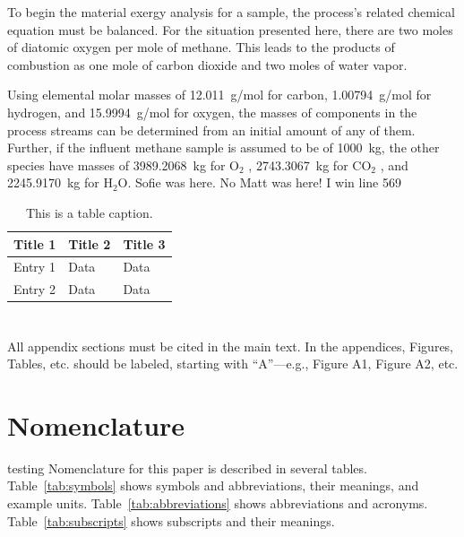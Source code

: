 \documentclass[energies,article,submit,pdftex,moreauthors]{Definitions/mdpi}
\begin{document}
To begin the material exergy analysis for a sample,
the process's related chemical equation must be balanced.
For the situation presented here,
there are two moles of diatomic oxygen per mole of methane.
This leads to the products of combustion as
one mole of carbon dioxide and two moles of water vapor. %

Using elemental molar masses of 12.011~g/mol for carbon,
1.00794~g/mol for hydrogen,
and 15.9994~g/mol for oxygen,
the masses of components in the process streams
can be determined from an initial amount of any of them.
Further, if the influent methane sample is assumed
to be of 1000~kg,
the other species have masses of 3989.2068~kg for O$_2$ ,
2743.3067~kg for CO$_2$ ,
and 2245.9170~kg for H$_2$O.
Sofie was here.
No Matt was here!
I win line 569
\begin{table}
\caption{This is a table caption.\label{tab5}}
\begin{tabularx}{\textwidth}{CCC}
\toprule
\textbf{Title 1}	& \textbf{Title 2}	& \textbf{Title 3}\\
\midrule
Entry 1		& Data			& Data\\
Entry 2		& Data			& Data\\
\bottomrule
\end{tabularx}
\end{table}

\section[\appendixname~\thesection]{}
All appendix sections must be cited in the main text. In the appendices, Figures, Tables, etc. should be labeled, starting with ``A''---e.g., Figure A1, Figure A2, etc.


\section[\appendixname~\thesection]{Nomenclature}
\label{sec:nomenclature}

testing
Nomenclature for this paper is described in several tables.
Table~\ref{tab:symbols} shows symbols and abbreviations, their meanings, and example units.
Table~\ref{tab:abbreviations} shows abbreviations and acronyms.
Table~\ref{tab:subscripts} shows subscripts and their meanings.
\end{document}
